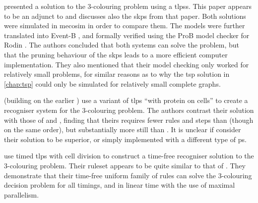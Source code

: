 
\citeauthor{Turcanu2012} \cite{Turcanu2012} presented a solution to the 3-colouring problem using a \glspl{tlps}. This paper appears to be an adjunct to \cite{Gheorghe2013} and discusses also the \gls{skps} from that paper.  Both solutions were simulated in \gls{mecosim} in order to compare them.  The models were further translated into Event-B \cite{Abrial2010}, and formally verified using the ProB model checker \cite{Leuschel2008} for Rodin \cite{Abrial2010a}.  The authors concluded that both systems can solve the problem, but that the pruning behaviour of the \gls{skps} leads to a more efficient computer implementation.  They also mentioned that their model checking only worked for relatively small problems, for similar reasons as to why the \gls{tsp} solution in \cref{chap:tsp} could only be simulated for relatively small complete graphs.


\citeauthor{Christinal2018} \cite{Christinal2018} (building on the earlier \cite{Mathu2015}) use a variant of \gls{tlps} \enquote{with protein on cells} to create a recogniser system for the 3-colouring problem.  The authors contrast their solution with those of \cite{Diaz-Pernil2008} and \cite{Gheorghe2013}, finding that theirs requires fewer rules and steps than \cite{Diaz-Pernil2008} (though on the same order), but substantially more still than \cite{Gheorghe2013}.  It is unclear if \citeauthor{Christinal2018} consider their solution to be superior, or simply implemented with a different type of \gls{ps}.


\citeauthor{Niu2016} \cite{Niu2016} use timed \gls{tlps} with cell division to construct a time-free recogniser solution to the 3-colouring problem. Their \gls{ruleset} appears to be quite similar to that of \cite{Turcanu2012}.  They demonstrate that their time-free uniform family of rules can solve the 3-colouring decision problem for all timings, and in linear time with the use of maximal parallelism.


